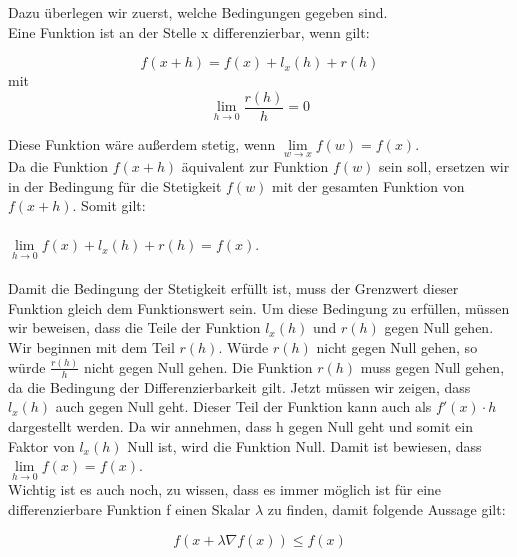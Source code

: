 Dazu überlegen wir zuerst, welche Bedingungen gegeben sind. \\
Eine Funktion ist an der Stelle x differenzierbar, wenn gilt:

\begin{equation*}f(x+h)=f(x)+l_x(h)+ r(h)  \end{equation*}  
mit 
\begin{equation*} \lim\limits_{h \rightarrow 0} \frac{r(h)}{h}= 0  \end{equation*}

Diese Funktion wäre außerdem stetig, wenn $\lim\limits_{w \rightarrow x} f(w)=f(x)$.\\
Da die Funktion $f(x+h)$ äquivalent zur Funktion $f(w)$ sein soll, ersetzen wir in der Bedingung für die Stetigkeit $f(w)$ mit der gesamten Funktion von $f(x+h)$.  
Somit gilt: \\ \\
$\lim\limits_{h \rightarrow 0} f(x)+l_x(h)+r(h)=f(x)$. \\ \\

Damit die Bedingung der Stetigkeit erfüllt ist, muss der Grenzwert dieser Funktion gleich dem Funktionswert sein. Um diese Bedingung zu erfüllen, müssen wir beweisen, dass die Teile der Funktion $l_x(h)$ und $r(h)$ gegen Null gehen. Wir beginnen mit dem Teil $r(h)$.  Würde $r(h)$ nicht gegen Null gehen, so würde $\frac{r(h)}{h}$ nicht gegen Null gehen. Die Funktion $r(h)$ muss gegen Null gehen, da die Bedingung der Differenzierbarkeit gilt. Jetzt müssen wir zeigen, dass $l_x(h)$ auch gegen Null geht. Dieser Teil der Funktion kann auch als $f'(x) \cdot h$ dargestellt werden. Da wir annehmen, dass h gegen Null geht und somit ein Faktor von $l_x(h)$ Null ist, wird die Funktion Null. Damit ist bewiesen, dass $\lim\limits_{h \rightarrow 0} f(x)=f(x)$. \\

Wichtig ist es auch noch, zu wissen, dass es immer möglich ist für eine differenzierbare Funktion f einen Skalar $\lambda$ zu finden, damit folgende Aussage gilt: 

\begin{equation}f(x + \lambda \nabla f(x)) \leq f(x)\end{equation} 


